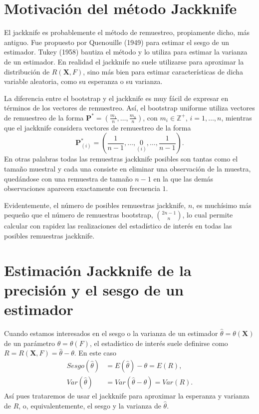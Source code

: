 \documentclass[
]{book}
\theoremstyle{break}
\theoremstyle{definition}
\theoremstyle{definition}
\theoremstyle{definition}
\theoremstyle{remark}
\begin{document}
\hypertarget{jackknife}{%
\section{Motivación del método Jackknife}\label{jackknife}}

El jackknife es probablemente el método de remuestreo, propiamente
dicho, más antiguo. Fue propuesto por Quenouille (1949) para estimar el
sesgo de un estimador. Tukey (1958) bautiza el método y lo utiliza para
estimar la varianza de un estimador. En realidad el jackknife no suele
utilizarse para aproximar la distribución de \(R\left( \mathbf{X},F \right)\),
sino más bien para estimar características de dicha
variable aleatoria, como su esperanza o su varianza.

La diferencia entre el bootstrap y el jackknife es muy fácil de expresar
en términos de los vectores de remuestreo. Así, el bootstrap uniforme
utiliza vectores de remuestreo de la forma
\(\mathbf{P}^{\ast}=\left( \frac{m_1}{n},\ldots ,\frac{m_n}{n} \right)\), con
\(m_i\in \mathbb{Z}^{+}\), \(i=1,\ldots ,n\), mientras que el jackknife considera
vectores de remuestreo de la forma
\[\mathbf{P}_{(i)}^{\ast}=\left( \frac{1}{n-1},\ldots ,\underset{(i)}{0}
,\ldots ,\frac{1}{n-1} \right).\]
En otras palabras todas las remuestras
jackknife posibles son tantas como el tamaño muestral y cada una
consiste en eliminar una observación de la muestra, quedándose con una
remuestra de tamaño \(n-1\) en la que las demás observaciones aparecen
exactamente con frecuencia \(1\).

Evidentemente, el número de posibles remuestras jackknife, \(n\), es
muchísimo más pequeño que el número de remuestras bootstrap,
\(\binom{2n-1}{n}\), lo cual permite calcular con rapidez las realizaciones
del estadístico de interés en todas las posibles remuestras jackknife.

\hypertarget{estimaciuxf3n-jackknife-de-la-precisiuxf3n-y-el-sesgo-de-un-estimador}{%
\section{Estimación Jackknife de la precisión y el sesgo de un estimador}\label{estimaciuxf3n-jackknife-de-la-precisiuxf3n-y-el-sesgo-de-un-estimador}}

Cuando estamos interesados en el sesgo o la varianza de un estimador
\(\hat{\theta}=\theta \left( \mathbf{X} \right)\) de un parámetro
\(\theta =\theta \left( F \right)\), el estadístico de interés suele
definirse como
\(R=R\left( \mathbf{X},F \right) =\hat{\theta}-\theta\).
En este caso
\[\begin{aligned}
Sesgo\left( \hat{\theta} \right) &= E\left( \hat{\theta} \right) -\theta
=E\left( R \right), \\
Var\left( \hat{\theta} \right) &= Var\left( \hat{\theta}-\theta \right)
=Var\left( R \right).
\end{aligned}\]
Así pues trataremos de usar el
jackknife para aproximar la esperanza y varianza de \(R\), o,
equivalentemente, el sesgo y la varianza de \(\hat{\theta}\).
\end{document}

